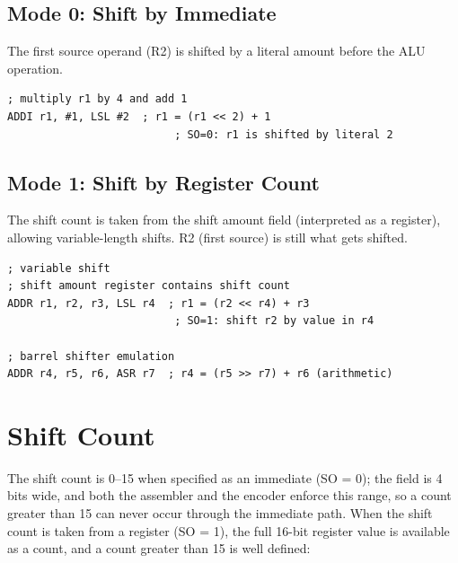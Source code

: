 \subsection{Mode 0: Shift by Immediate}

The first source operand (R2) is shifted by a literal amount before the ALU operation.

\begin{lstlisting}
; multiply r1 by 4 and add 1
ADDI r1, #1, LSL #2  ; r1 = (r1 << 2) + 1
                          ; SO=0: r1 is shifted by literal 2

\end{lstlisting}

\subsection{Mode 1: Shift by Register Count}

The shift count is taken from the shift amount field (interpreted as a register), allowing variable-length shifts. R2
(first source) is still what gets shifted.

\begin{lstlisting}
; variable shift
; shift amount register contains shift count
ADDR r1, r2, r3, LSL r4  ; r1 = (r2 << r4) + r3
                          ; SO=1: shift r2 by value in r4

; barrel shifter emulation
ADDR r4, r5, r6, ASR r7  ; r4 = (r5 >> r7) + r6 (arithmetic)
\end{lstlisting}

\section{Shift Count}

The shift count is 0--15 when specified as an immediate (SO = 0); the field is 4 bits wide, and both the assembler and
the encoder enforce this range, so a count greater than 15 can never occur through the immediate path. When the shift
count is taken from a register (SO = 1), the full 16-bit register value is available as a count, and a count greater
than 15 is well defined:

